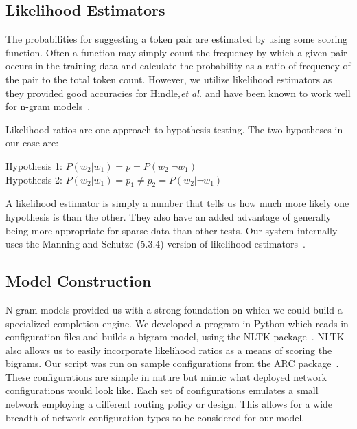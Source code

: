 \subsection{Likelihood Estimators} 

The probabilities for suggesting a token pair are estimated by using some scoring function. Often a function may simply count the frequency by which a given pair occurs in the training data and calculate the probability as a ratio of frequency of the pair to the total token count. However, we utilize likelihood estimators as they provided good accuracies for Hindle,\textit{et al.} and have been known to work well for n-gram models~\cite{manning}.

Likelihood ratios are one approach to hypothesis testing. The two hypotheses in our case are:

\begin{center}
Hypothesis 1: $P(w_2|w_1) = p = P(w_2|\neg w_1)$ \\
Hypothesis 2: $P(w_2|w_1) = p_1 \neq p_2 = P(w_2|\neg w_1)$	\\	
\end{center}

A likelihood estimator is simply a number that tells us how much more likely one hypothesis is than the other. They also have an added advantage of generally being more appropriate for sparse data than other tests. Our system internally uses the Manning and Schutze (5.3.4) version of likelihood estimators~\cite{manning}.


\subsection{Model Construction}

N-gram models provided us with a strong foundation on which we could build a specialized completion engine. We developed a program in Python which reads in configuration files and builds a bigram model, using the NLTK package~\cite{nltk}. NLTK also allows us to easily incorporate likelihood ratios as a means of scoring the bigrams. Our script was run on sample configurations from the ARC package~\cite{arc}. These configurations are simple in nature but mimic what deployed network configurations would look like. Each set of configurations emulates a small network employing a different routing policy or design. This allows for a wide breadth of network configuration types to be considered for our model.\\ 

